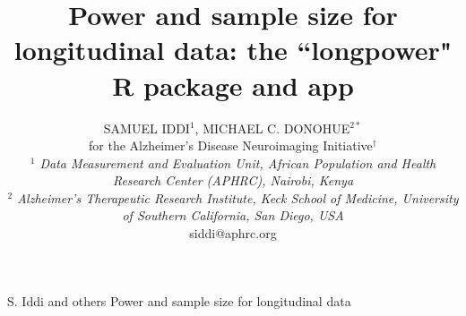 \documentclass[oupdraft]{bio}
\begin{document}
	
	\title{Power and sample size for longitudinal data: the ``longpower" R package and app}
	
	\author{SAMUEL IDDI$^1$, MICHAEL C. DONOHUE$^{2\ast}$\\[4pt]
		for the Alzheimer's Disease Neuroimaging Initiative$^\dagger$\\[4pt]
		\textit{$^1$ Data Measurement and Evaluation Unit,
			African Population and Health Research Center (APHRC),
			Nairobi, Kenya\\
		$^2$ 	Alzheimer's Therapeutic Research Institute,
		Keck School of Medicine,
		University of Southern California,
		San Diego, USA}
		\\[2pt]
		{siddi@aphrc.org}}
	
	\markboth%
	{S. Iddi and others}
	{Power and sample size for longitudinal data}
	
	\maketitle
	
	
\end{document}
